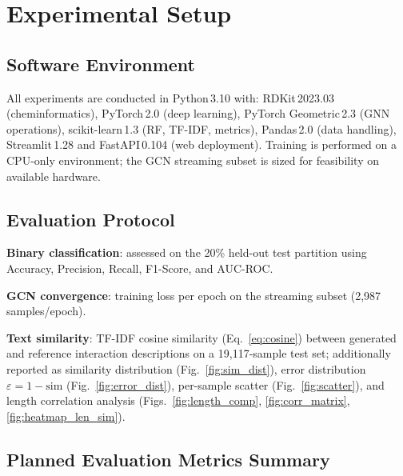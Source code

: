 \documentclass[conference]{IEEEtran}
\begin{document}
\section{Experimental Setup}
\label{sec:exp}

\subsection{Software Environment}

All experiments are conducted in Python\,3.10 with: RDKit\,2023.03 (cheminformatics),
PyTorch\,2.0 (deep learning), PyTorch Geometric\,2.3 (GNN operations),
scikit-learn\,1.3 (RF, TF-IDF, metrics), Pandas\,2.0 (data handling), Streamlit\,1.28
and FastAPI\,0.104 (web deployment). Training is performed on a CPU-only environment;
the GCN streaming subset is sized for feasibility on available hardware.

\subsection{Evaluation Protocol}

\textbf{Binary classification}: assessed on the 20\% held-out test partition using
Accuracy, Precision, Recall, F1-Score, and AUC-ROC.

\textbf{GCN convergence}: training loss per epoch on the streaming subset (2,987 samples/epoch).

\textbf{Text similarity}: TF-IDF cosine similarity (Eq.~\ref{eq:cosine}) between generated
and reference interaction descriptions on a 19,117-sample test set; additionally reported
as similarity distribution (Fig.~\ref{fig:sim_dist}), error distribution
$\varepsilon = 1-\mathrm{sim}$ (Fig.~\ref{fig:error_dist}), per-sample scatter
(Fig.~\ref{fig:scatter}), and length correlation analysis (Figs.~\ref{fig:length_comp},
\ref{fig:corr_matrix}, \ref{fig:heatmap_len_sim}).

\subsection{Planned Evaluation Metrics Summary}
\end{document}
